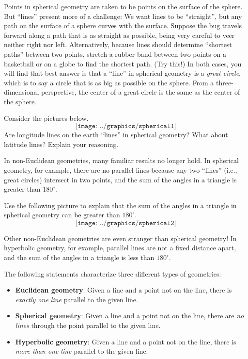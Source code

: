 Points in spherical geometry are taken to be points on the surface of the sphere.  But ``lines'' present more of a challenge:  We want lines to be ``straight'', but any path on the surface of a sphere curves with the surface.  Suppose the bug travels forward along a path that is as straight as possible, being very careful to veer neither right nor left.  Alternatively, because lines should determine ``shortest paths'' between two points, stretch a rubber band between two points on a basketball or on a globe to find the shortest path.  (Try this!)  In both cases, you will find that best answer is that a ``line'' in spherical geometry is a \emph{great circle}, which is to say a circle that is as big as possible on the sphere.  From a three-dimensional perspective, the center of a great circle is the same as the center of the sphere.  
\begin{question}
Consider the pictures below. 
$$\texttt{[image: ../graphics/spherical1]}$$
Are longitude lines on the earth ``lines'' in spherical geometry?  What about latitude lines?  Explain your reasoning.  
\end{question}
\QM


In non-Euclidean geometries, many familiar results no longer hold.  In spherical geometry, for example, there are no parallel lines because any two ``lines'' (i.e., great circles) intersect in two points, and the sum of the angles in a triangle is greater than $180^\circ$.  
\begin{question}
Use the following picture to explain that the sum of the angles in a triangle in spherical geometry can be greater than $180^\circ$. 
$$\texttt{[image: ../graphics/spherical2]}$$
\end{question}
\QM

Other non-Euclidean geometries are even stranger than spherical geometry!  In hyperbolic geometry, for example, parallel lines are not a fixed distance apart, and the sum of the angles in a triangle is less than $180^\circ$.  

The following statements characterize three different types of geometries:  
\begin{itemize}
\item \textbf{Euclidean geometry}: Given a line and a point not on the line, there is \emph{exactly one line} parallel to the given line.

\item \textbf{Spherical geometry}:  Given a line and a point not on the line, there are \emph{no lines} through the point parallel to the given line. 

\item \textbf{Hyperbolic geometry}:  Given a line and a point not on the line, there is \emph{more than one line} parallel to the given line. 
\end{itemize}

